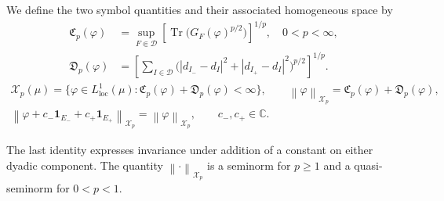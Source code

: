 \documentclass[11pt]{amsart}
\newcommand{\D}{\mathcal D}
\newcommand{\X}{\mathcal X}
\newcommand{\tr}{\operatorname{Tr}}
\newcommand{\norm}[1]{\left\|#1\right\|}
\newcommand{\fin}{\Subset}
\begin{document}
We define the two symbol quantities and their associated homogeneous
space by
\begin{align}
 \mathfrak C_p(\varphi)
   &=\sup_{F\fin\D}\left[\tr\big(G_F(\varphi)^{p/2}\big)\right]^{1/p},
                         \quad 0<p<\infty,\label{carleson}\tag{C}\\
 \mathfrak D_p(\varphi)
   &=\left[\sum_{I\in\D}
       \big(|d_{I_-}-d_I|^2+|d_{I_+}-d_I|^2\big)^{p/2}\right]^{1/p}.
                         \label{gradient}\tag{D}
\end{align}
\begin{gather*}
 \X_p(\mu)=\{\varphi\in L^1_{\mathrm{loc}}(\mu):
       \mathfrak C_p(\varphi)+\mathfrak D_p(\varphi)<\infty\},\qquad
 \norm{\varphi}_{\X_p}=\mathfrak C_p(\varphi)+\mathfrak D_p(\varphi),\\
 \norm{\varphi+c_-\mathbf1_{E_-}+c_+\mathbf1_{E_+}}_{\X_p}
       =\norm{\varphi}_{\X_p},\qquad c_-,c_+\in\mathbb C.
\end{gather*}

The last identity expresses invariance under addition of a constant
on either dyadic component. The quantity $\norm{\cdot}_{\X_p}$ is a
seminorm for $p\ge1$ and a quasi-seminorm for $0<p<1$.
\end{document}
